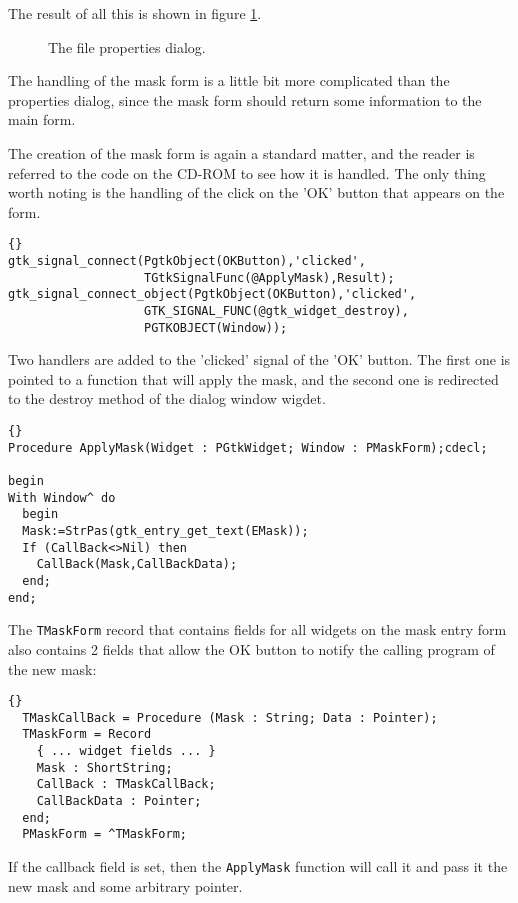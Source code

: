 \documentclass[10pt]{article}
\begin{document}
The result of all this is shown in figure \ref{fig:fileprops}.
\begin{figure}[ht]
\begin{center}
\caption{The file properties dialog.}\label{fig:fileprops}
\end{center}
\end{figure}

The handling of the mask form is a little bit more complicated than the
properties dialog, since the mask form should return some information
to the main form. 

The creation of the mask form is again a standard matter, and the reader 
is referred to the code on the CD-ROM to see how it is handled. The
only thing worth noting is the handling of the click on the 'OK' button that
appears on the form.
\begin{lstlisting}{}
gtk_signal_connect(PgtkObject(OKButton),'clicked',
                   TGtkSignalFunc(@ApplyMask),Result);
gtk_signal_connect_object(PgtkObject(OKButton),'clicked',
                   GTK_SIGNAL_FUNC(@gtk_widget_destroy),
                   PGTKOBJECT(Window));                                      
\end{lstlisting}
Two handlers are added to the 'clicked' signal of the 'OK' button.
The first one is pointed to a function that will apply the mask, and the
second one is redirected to the destroy method of the dialog window wigdet.
\begin{lstlisting}{}
Procedure ApplyMask(Widget : PGtkWidget; Window : PMaskForm);cdecl;
 
begin
With Window^ do
  begin
  Mask:=StrPas(gtk_entry_get_text(EMask));
  If (CallBack<>Nil) then
    CallBack(Mask,CallBackData);
  end;
end;
\end{lstlisting}
The \lstinline|TMaskForm| record that contains fields for all widgets on
the mask entry form also contains 2 fields that allow the OK button to notify 
the calling program of the new mask:
\begin{lstlisting}{}
  TMaskCallBack = Procedure (Mask : String; Data : Pointer);
  TMaskForm = Record
    { ... widget fields ... }
    Mask : ShortString;
    CallBack : TMaskCallBack;
    CallBackData : Pointer;
  end;
  PMaskForm = ^TMaskForm;                                                       
\end{lstlisting}
If the callback field is set, then the \lstinline|ApplyMask| function will call
it and pass it the new mask and some arbitrary pointer.
\end{document}
